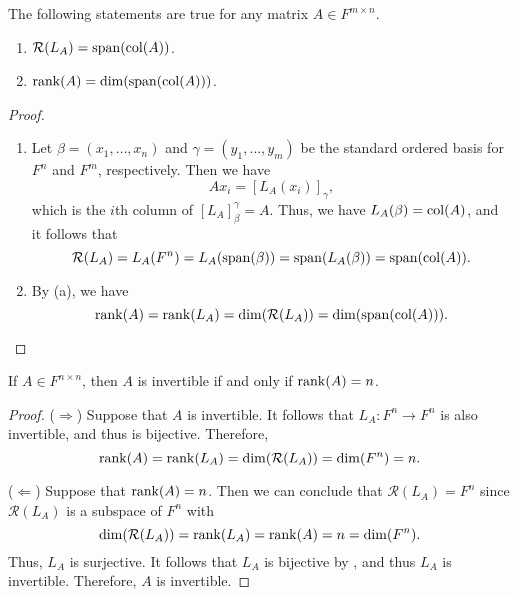 \begin{theorem}
  \label{thm:column-space}
  The following statements are true for any matrix $A \in F^{m \times n}$.
  \begin{enumerate}
    \item $\mathcal{R}(L_A) = \operatorname{span}(\operatorname{col}(A))$.
    \item $\operatorname{rank}(A) = \dim(\operatorname{span}(\operatorname{col}(A)))$.
  \end{enumerate}
\end{theorem}
\begin{proof}
  \leavevmode
  \begin{enumerate}
    \item Let $\beta = (x_1, \dots, x_n)$ and $\gamma = (y_1, \dots, y_m)$ be
    the standard ordered basis for $F^n$ and $F^m$, respectively.
    Then we have
    \begin{equation*}
      Ax_i = [L_A(x_i)]_\gamma,
    \end{equation*}
    which is the $i$th column of $[L_A]_\beta^\gamma = A$.
    Thus, we have $L_A(\beta) = \operatorname{col}(A)$, and it follows that
    \begin{equation*}
      \mathcal{R}(L_A)
      = L_A(F^n)
      = L_A(\operatorname{span}(\beta))
      = \operatorname{span}(L_A(\beta))
      = \operatorname{span}(\operatorname{col}(A)).
    \end{equation*}

    \item By (a), we have
    \begin{equation*}
      \operatorname{rank}(A)
      = \operatorname{rank}(L_A)
      = \dim(\mathcal{R}(L_A))
      = \dim(\operatorname{span}(\operatorname{col}(A))).
      \qedhere
    \end{equation*}
  \end{enumerate}
\end{proof}

\begin{theorem}
  \label{thm:full-rank}
  If $A \in F^{n \times n}$, then $A$ is invertible if and only if
  $\operatorname{rank}(A) = n$.
\end{theorem}
\begin{proof}
  ($\Rightarrow$)
  Suppose that $A$ is invertible.
  It follows that $L_A: F^n \to F^n$ is also invertible, and thus is
  bijective.
  Therefore,
  \begin{equation*}
    \operatorname{rank}(A) = \operatorname{rank}(L_A) = \dim(\mathcal{R}(L_A)) = \dim(F^n) = n.
  \end{equation*}
  
  ($\Leftarrow$)
  Suppose that $\operatorname{rank}(A) = n$.
  Then we can conclude that $\mathcal{R}(L_A) = F^n$ since $\mathcal{R}(L_A)$
  is a subspace of $F^n$ with
  \begin{equation*}
    \dim(\mathcal{R}(L_A)) = \operatorname{rank}(L_A) = \operatorname{rank}(A) = n = \dim(F^n).
  \end{equation*}
  Thus, $L_A$ is surjective.
  It follows that $L_A$ is bijective by , and thus
  $L_A$ is invertible.
  Therefore, $A$ is invertible.
\end{proof}

